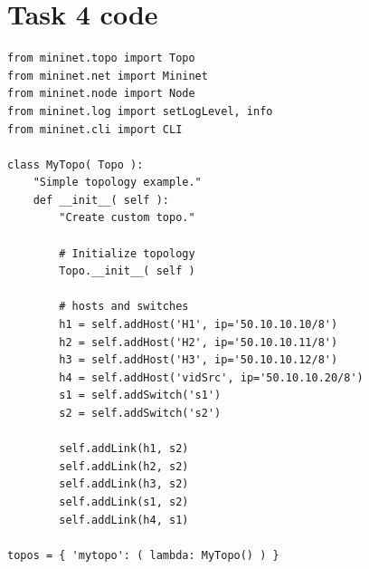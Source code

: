 \documentclass{article}
\begin{document}
\newpage
\section{Task 4 code}
\begin{lstlisting}
from mininet.topo import Topo
from mininet.net import Mininet
from mininet.node import Node
from mininet.log import setLogLevel, info
from mininet.cli import CLI

class MyTopo( Topo ):  
    "Simple topology example."
    def __init__( self ):
        "Create custom topo."

        # Initialize topology
        Topo.__init__( self )

        # hosts and switches 
        h1 = self.addHost('H1', ip='50.10.10.10/8')
        h2 = self.addHost('H2', ip='50.10.10.11/8')
        h3 = self.addHost('H3', ip='50.10.10.12/8')
        h4 = self.addHost('vidSrc', ip='50.10.10.20/8')
        s1 = self.addSwitch('s1')
        s2 = self.addSwitch('s2')

        self.addLink(h1, s2)
        self.addLink(h2, s2)
        self.addLink(h3, s2)
        self.addLink(s1, s2)
        self.addLink(h4, s1)

topos = { 'mytopo': ( lambda: MyTopo() ) } 
\end{lstlisting}
\end{document}

